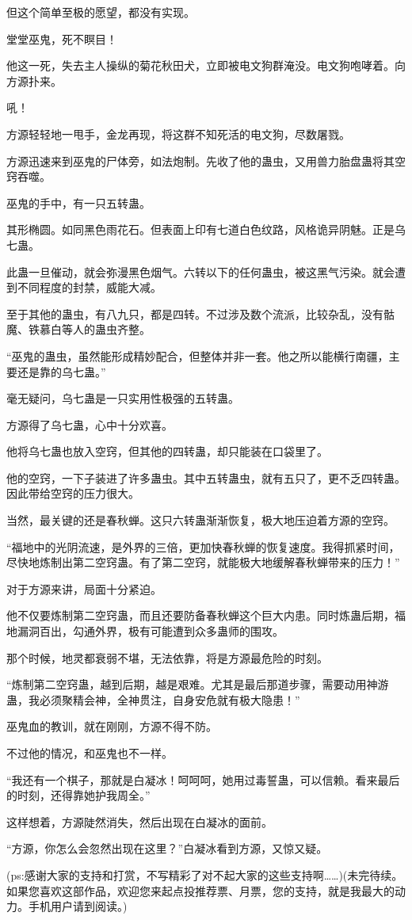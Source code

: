 \begin{this_body}
但这个简单至极的愿望，都没有实现。

堂堂巫鬼，死不瞑目！

他这一死，失去主人操纵的菊花秋田犬，立即被电文狗群淹没。电文狗咆哮着。向方源扑来。

吼！

方源轻轻地一甩手，金龙再现，将这群不知死活的电文狗，尽数屠戮。

方源迅速来到巫鬼的尸体旁，如法炮制。先收了他的蛊虫，又用兽力胎盘蛊将其空窍吞噬。

巫鬼的手中，有一只五转蛊。

其形椭圆。如同黑色雨花石。但表面上印有七道白色纹路，风格诡异阴魅。正是乌七蛊。

此蛊一旦催动，就会弥漫黑色烟气。六转以下的任何蛊虫，被这黑气污染。就会遭到不同程度的封禁，威能大减。

至于其他的蛊虫，有八九只，都是四转。不过涉及数个流派，比较杂乱，没有骷魔、铁慕白等人的蛊虫齐整。

“巫鬼的蛊虫，虽然能形成精妙配合，但整体并非一套。他之所以能横行南疆，主要还是靠的乌七蛊。”

毫无疑问，乌七蛊是一只实用性极强的五转蛊。

方源得了乌七蛊，心中十分欢喜。

他将乌七蛊也放入空窍，但其他的四转蛊，却只能装在口袋里了。

他的空窍，一下子装进了许多蛊虫。其中五转蛊虫，就有五只了，更不乏四转蛊。因此带给空窍的压力很大。

当然，最关键的还是春秋蝉。这只六转蛊渐渐恢复，极大地压迫着方源的空窍。

“福地中的光阴流速，是外界的三倍，更加快春秋蝉的恢复速度。我得抓紧时间，尽快地炼制出第二空窍蛊。有了第二空窍，就能极大地缓解春秋蝉带来的压力！”

对于方源来讲，局面十分紧迫。

他不仅要炼制第二空窍蛊，而且还要防备春秋蝉这个巨大内患。同时炼蛊后期，福地漏洞百出，勾通外界，极有可能遭到众多蛊师的围攻。

那个时候，地灵都衰弱不堪，无法依靠，将是方源最危险的时刻。

“炼制第二空窍蛊，越到后期，越是艰难。尤其是最后那道步骤，需要动用神游蛊，我必须聚精会神，全神贯注，自身安危就有极大隐患！”

巫鬼血的教训，就在刚刚，方源不得不防。

不过他的情况，和巫鬼也不一样。

“我还有一个棋子，那就是白凝冰！呵呵呵，她用过毒誓蛊，可以信赖。看来最后的时刻，还得靠她护我周全。”

这样想着，方源陡然消失，然后出现在白凝冰的面前。

“方源，你怎么会忽然出现在这里？”白凝冰看到方源，又惊又疑。

(ps:感谢大家的支持和打赏，不写精彩了对不起大家的这些支持啊……)(未完待续。如果您喜欢这部作品，欢迎您来起点投推荐票、月票，您的支持，就是我最大的动力。手机用户请到阅读。)

\end{this_body}

